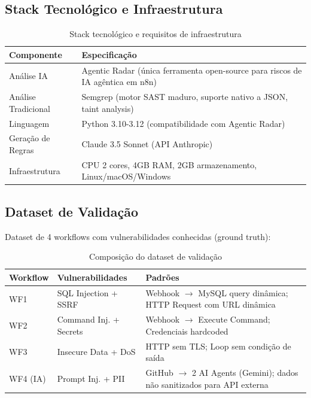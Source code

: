 \documentclass[12pt,a4paper]{article}
\begin{document}
\subsection{Stack Tecnológico e Infraestrutura}

\begin{table}[H]
\centering \small
\caption{Stack tecnológico e requisitos de infraestrutura}
\label{tab:stack}
\begin{tabular}{@{}lp{10cm}@{}}
\toprule
\textbf{Componente} & \textbf{Especificação} \\ \midrule
Análise IA & Agentic Radar (única ferramenta open-source para riscos de IA agêntica em n8n) \\
Análise Tradicional & Semgrep (motor SAST maduro, suporte nativo a JSON, taint analysis) \\
Linguagem & Python 3.10-3.12 (compatibilidade com Agentic Radar) \\
Geração de Regras & Claude 3.5 Sonnet (API Anthropic) \\
\midrule
Infraestrutura & CPU 2 cores, 4GB RAM, 2GB armazenamento, Linux/macOS/Windows \\
\bottomrule
\end{tabular}
\end{table}

\subsection{Dataset de Validação}

Dataset de 4 workflows com vulnerabilidades conhecidas (ground truth):

\begin{table}[H]
\centering \small
\caption{Composição do dataset de validação}
\label{tab:dataset}
\begin{tabular}{@{}p{2cm}p{4cm}p{6.5cm}@{}}
\toprule
\textbf{Workflow} & \textbf{Vulnerabilidades} & \textbf{Padrões} \\ \midrule
WF1 & SQL Injection + SSRF & Webhook $\rightarrow$ MySQL query dinâmica; HTTP Request com URL dinâmica \\
WF2 & Command Inj. + Secrets & Webhook $\rightarrow$ Execute Command; Credenciais hardcoded \\
WF3 & Insecure Data + DoS & HTTP sem TLS; Loop sem condição de saída \\
WF4 (IA) & Prompt Inj. + PII & GitHub $\rightarrow$ 2 AI Agents (Gemini); dados não sanitizados para API externa \\
\bottomrule
\end{tabular}
\end{table}
\end{document}
